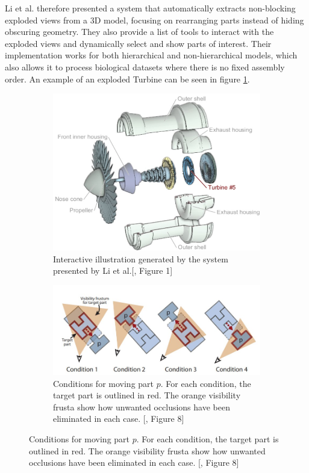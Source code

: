 Li et al. therefore presented a system that automatically extracts non-blocking exploded views from a 3D model, focusing on rearranging parts instead of hiding obscuring geometry.\cite{Wilmot_Li_2008}
They also provide a list of tools to interact with the exploded views and dynamically select and show parts of interest.
Their implementation works for both hierarchical and non-hierarchical models, which also allows it to process biological datasets where there is no fixed assembly order. An example of an exploded Turbine can be seen in figure \ref{fig:Li_fig1}.
\begin{figure}
	\centering
	\normalsize
	\begin{subfigure}[t]{0.49\textwidth}
		\centering
		\includegraphics[width=.95\linewidth]{fig/Images/AutomatedGenerationofInteractive3DExplodedViewDiagrams_Li2008_fig1}
		\caption[]{Interactive illustration generated by the system presented by Li et al.[\cite{Wilmot_Li_2008}, Figure 1]}
		\label{fig:Li_fig1}
	\end{subfigure}
	\smallskip
	\begin{subfigure}[t]{0.5\textwidth}
		\centering
		\includegraphics[width=1.1\linewidth]{fig/Images/AutomatedGenerationofInteractive3DExplodedViewDiagrams_Li2008_fig8}
		\caption[]{Conditions for moving part $p$. For each condition, the target part is outlined in red. The orange visibility frusta show how unwanted occlusions have been eliminated in each case. [\cite{Wilmot_Li_2008}, Figure 8]}
		\label{fig:conditionTests}
	\end{subfigure}
\end{figure}
